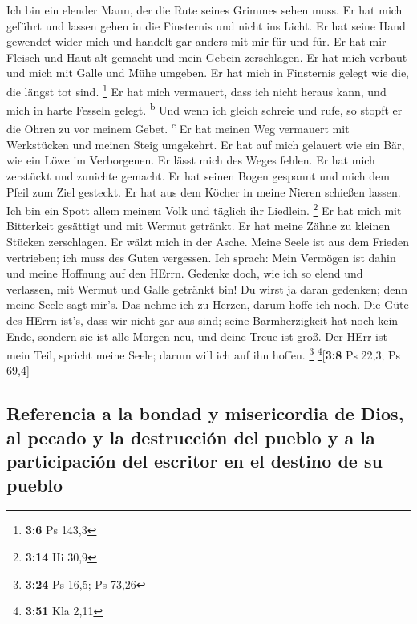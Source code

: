 Ich bin ein elender Mann, der die Rute seines Grimmes
sehen muss.  Er hat mich geführt und lassen gehen in die
Finsternis und nicht ins Licht.  Er hat seine Hand
gewendet wider mich und handelt gar anders mit mir für und für.
 Er hat mir Fleisch und Haut alt gemacht und mein Gebein
zerschlagen.  Er hat mich verbaut und mich mit Galle und
Mühe umgeben.  Er hat mich in Finsternis gelegt wie die,
die längst tot sind. \footnote{\textbf{3:6} Ps 143,3}  Er
hat mich vermauert, dass ich nicht heraus kann, und mich in harte
Fesseln gelegt. \textsuperscript{b}  Und wenn ich gleich
schreie und rufe, so stopft er die Ohren zu vor meinem Gebet.
\textsuperscript{c}  Er hat meinen Weg vermauert mit
Werkstücken und meinen Steig umgekehrt.  Er hat auf mich
gelauert wie ein Bär, wie ein Löwe im Verborgenen.  Er
lässt mich des Weges fehlen. Er hat mich zerstückt und zunichte gemacht.
 Er hat seinen Bogen gespannt und mich dem Pfeil zum Ziel
gesteckt.  Er hat aus dem Köcher in meine Nieren schießen
lassen.  Ich bin ein Spott allem meinem Volk und täglich
ihr Liedlein. \footnote{\textbf{3:14} Hi 30,9}  Er hat
mich mit Bitterkeit gesättigt und mit Wermut getränkt. 
Er hat meine Zähne zu kleinen Stücken zerschlagen. Er wälzt mich in der
Asche.  Meine Seele ist aus dem Frieden vertrieben; ich
muss des Guten vergessen.  Ich sprach: Mein Vermögen ist
dahin und meine Hoffnung auf den HErrn.  Gedenke doch,
wie ich so elend und verlassen, mit Wermut und Galle getränkt bin!
 Du wirst ja daran gedenken; denn meine Seele sagt mir's.
 Das nehme ich zu Herzen, darum hoffe ich noch.
 Die Güte des HErrn ist's, dass wir nicht gar aus sind;
seine Barmherzigkeit hat noch kein Ende,  sondern sie ist
alle Morgen neu, und deine Treue ist groß.  Der HErr ist
mein Teil, spricht meine Seele; darum will ich auf ihn hoffen.
\footnote{\textbf{3:24} Ps 16,5; Ps 73,26} \footnote{\textbf{3:51} Kla
  2,11}{[}\textbf{3:8} Ps 22,3; Ps 69,4{]}

\hypertarget{referencia-a-la-bondad-y-misericordia-de-dios-al-pecado-y-la-destrucciuxf3n-del-pueblo-y-a-la-participaciuxf3n-del-escritor-en-el-destino-de-su-pueblo}{%
\subsection{Referencia a la bondad y misericordia de Dios, al pecado y
la destrucción del pueblo y a la participación del escritor en el
destino de su
pueblo}\label{referencia-a-la-bondad-y-misericordia-de-dios-al-pecado-y-la-destrucciuxf3n-del-pueblo-y-a-la-participaciuxf3n-del-escritor-en-el-destino-de-su-pueblo}}

